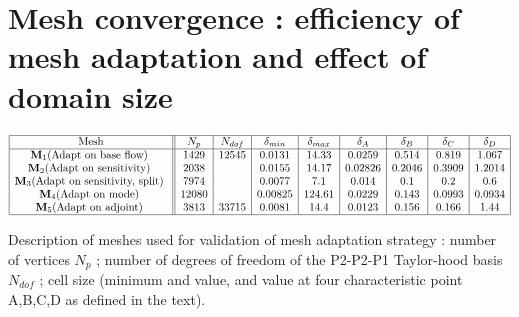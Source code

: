 \documentclass[twocolumn,10pt]{asme2ej}
\begin{document}
\section{Mesh convergence : efficiency of mesh adaptation and effect of domain size}


\begin{table}
$$
\begin{array}{|c||c|c|c|c|c|c|c|c|c|}
\hline
\mbox{Mesh} & N_p & N_{dof} & \delta_{min} & \delta_{max} & \delta_A  & \delta_B  & \delta_C  & \delta_D  \\
\hline
\mathbf{M}_1 \mbox{(Adapt on base flow) } & 1429 & 12545	& 0.0131 & 14.33 		& 0.0259 	& 0.514 	& 0.819 	& 1.067 \\   
\mathbf{M}_2 \mbox{(Adapt on sensitivity) } & 2038 & 		& 0.0155 & 14.17 		& 0.02826 & 0.2046 	& 0.3909 	& 1.2014 	\\
\mathbf{M}_3 \mbox{(Adapt on sensitivity, split) } & 7974 &		& 0.0077 & 7.1  		& 0.014 	& 0.1 	&   0.2 	& 0.6   \\
\mathbf{M}_4 \mbox{(Adapt on mode) } 	& 12080  &			&0.00825	& 124.61		& 0.0229	& 0.143	& 0.0993	& 0.0934 \\
\mathbf{M}_5 \mbox{(Adapt on adjoint) } 	& 3813 	& 33715		& 0.0081	& 14.4		& 0.0123 	& 0.156	& 0.166	& 1.44  \\
\hline
\end{array}
$$
\caption{Description of meshes used for validation of mesh adaptation strategy : number of vertices $N_p$ ; number of degrees of freedom of the P2-P2-P1 Taylor-hood basis $N_{dof}$ ; cell size (minimum and value, and value at four characteristic point A,B,C,D as defined in the text). 
 }
\label{tab:conv1}
\end{table}
\end{document}
